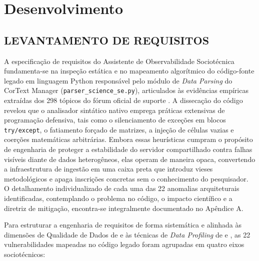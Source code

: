 \documentclass[
	oneside,
	a4paper,
	12pt,
	chapter=TITLE,
	section=TITLE,
	english,
	brazilian
]{abntex2}
\begin{document}
\chapter{Desenvolvimento}\label{sec:desenvolvimento}


\FloatBarrier
\section{LEVANTAMENTO DE REQUISITOS}\label{sec:levantamento_de_requisitos}


A especificação de requisitos do Assistente de Observabilidade Sociotécnica fundamenta-se na inspeção estática e no mapeamento algorítmico do código-fonte legado em linguagem Python responsável pelo módulo de \textit{Data Parsing} do CorText Manager (\texttt{parser\_\allowbreak science\_\allowbreak se.\allowbreak py}), articulados às evidências empíricas extraídas dos 298 tópicos do fórum oficial de suporte \cite{CorText2026}. A dissecação do código revelou que o analisador sintático nativo emprega práticas extensivas de programação defensiva, tais como o silenciamento de exceções em blocos \texttt{try/\allowbreak except}, o fatiamento forçado de matrizes, a injeção de células vazias e coerções matemáticas arbitrárias. Embora essas heurísticas cumpram o propósito de engenharia de proteger a estabilidade do servidor compartilhado contra falhas visíveis diante de dados heterogêneos, elas operam de maneira opaca, convertendo a infraestrutura de ingestão em uma caixa preta \cite{Latour1987} que introduz vieses metodológicos e apaga inscrições concretas \cite{Abdo2021} sem o conhecimento do pesquisador. O detalhamento individualizado de cada uma das 22 anomalias arquiteturais identificadas, contemplando o problema no código, o impacto científico e a diretriz de mitigação, encontra-se integralmente documentado no Apêndice A.

Para estruturar a engenharia de requisitos de forma sistemática e alinhada às dimensões de Qualidade de Dados de  e às técnicas de \textit{Data Profiling} de  e , as 22 vulnerabilidades mapeadas no código legado foram agrupadas em quatro eixos sociotécnicos:
\end{document}
